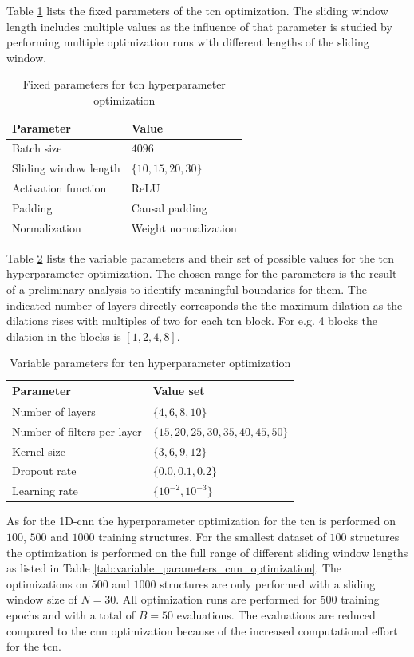 \documentclass[conference]{IEEEtran}
\begin{document}
Table \ref{tab:fixed_parameters_tcn_optimization} lists the fixed parameters of the \gls{tcn} optimization. The sliding window length includes multiple values as the influence of that parameter is studied by performing multiple optimization runs with different lengths of the sliding window.

\begin{table}[htp]
	\centering
	\caption{Fixed parameters for \gls{tcn} hyperparameter optimization}
	\label{tab:fixed_parameters_tcn_optimization}
	\begin{tabular}{ll}
		\textbf{Parameter} & \textbf{Value} \\
		\hline
		Batch size & $ 4096 $ \\
		Sliding window length & $ \{10, 15, 20, 30\} $ \\
		Activation function & ReLU \\
		Padding & Causal padding \\
		Normalization & Weight normalization
	\end{tabular}
\end{table}

Table \ref{tab:variable_parameters_tcn_optimization} lists the variable parameters and their set of possible values for the \gls{tcn} hyperparameter optimization. The chosen range for the parameters is the result of a preliminary analysis to identify meaningful boundaries for them. The indicated number of layers directly corresponds the the maximum dilation as the dilations rises with multiples of two for each \gls{tcn} block. For e.g. 4 blocks the dilation in the blocks is $ [1, 2, 4, 8] $.


\begin{table}[htp]
	\centering
	\caption{Variable parameters for \gls{tcn} hyperparameter optimization}
	\label{tab:variable_parameters_tcn_optimization}
	\begin{tabular}{ll}
		\textbf{Parameter} & \textbf{Value set} \\
		\hline
		Number of layers & $ \{4, 6, 8, 10\} $ \\
		Number of filters per layer & $ \{15, 20, 25, 30, 35, 40, 45, 50\} $ \\
		Kernel size & $ \{3, 6, 9, 12\} $ \\
		Dropout rate & $ \{0.0, 0.1, 0.2\} $ \\
		Learning rate & $ \{10^{-2}, 10^{-3}\} $
	\end{tabular}
\end{table}

As for the 1D-\gls{cnn} the hyperparameter optimization for the \gls{tcn} is performed on $ 100 $, $ 500 $ and $ 1000 $  training structures. For the smallest dataset of $ 100 $ structures the optimization is performed on the full range of different sliding window lengths as listed in Table \ref{tab:variable_parameters_cnn_optimization}. The optimizations on $ 500 $ and $ 1000 $ structures are only performed with a sliding window size of $ N = 30 $. All optimization runs are performed for 500 training epochs and with a total of $ B = 50 $ evaluations. The evaluations are reduced compared to the \gls{cnn} optimization because of the increased computational effort for the \gls{tcn}.
\end{document}
